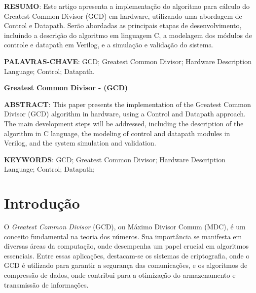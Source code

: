 \documentclass[a4paper,11pt]{article} %
\begin{document}


\begin{center}
    \tableofcontents %
\end{center}

\newpage


\vspace{0.5cm}
\noindent\textbf{RESUMO}:
Este artigo apresenta a implementação do algoritmo para cálculo do
Greatest Common Divisor (GCD) em hardware,
utilizando uma abordagem de Control e Datapath.
Serão abordadas as principais etapas de desenvolvimento,
incluindo a descrição do algoritmo em linguagem C,
a modelagem dos módulos de controle e datapath em Verilog,
e a simulação e validação do sistema.

\vspace{0.5cm}
\noindent\textbf{PALAVRAS-CHAVE}: 
GCD; Greatest Common Divisor; Hardware Description Language; Control; Datapath.

\vspace{0.5cm}
\begin{center}
    \textbf{Greatest Common Divisor - (GCD)}
\end{center}

\noindent\textbf{ABSTRACT}:
This paper presents the implementation of the Greatest Common Divisor (GCD)
algorithm in hardware, using a Control and Datapath approach.
The main development steps will be addressed,
including the description of the algorithm in C language,
the modeling of control and datapath modules in Verilog,
and the system simulation and validation.

\vspace{0.5cm}
\noindent\textbf{KEYWORDS}: 
GCD; Greatest Common Divisor; Hardware Description Language; Control; Datapath;

\section{Introdução}

O \textit{Greatest Common Divisor} (GCD), ou Máximo Divisor Comum (MDC), é um conceito fundamental na teoria dos números. Sua importância se manifesta em diversas áreas da computação, onde desempenha um papel crucial em algoritmos essenciais. Entre essas aplicações, destacam-se os sistemas de criptografia, onde o GCD é utilizado para garantir a segurança das comunicações, e os algoritmos de compressão de dados, onde contribui para a otimização do armazenamento e transmissão de informações.
\end{document}
